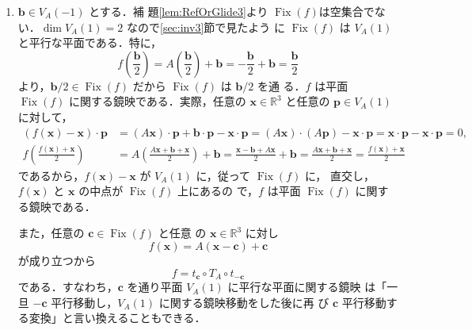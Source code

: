 \documentclass[11pt, uplatex, dvipdfmx, titlepage]{jsarticle}
\makeatletter
\DeclareMathOperator{\Fix}{Fix}
\renewenvironment{proof}[1][\proofname]{\par
  \pushQED{\qed}%
  \normalfont \topsep6\p@\@plus6\p@\relax
  \trivlist
  \item[\hskip\labelsep
         \bfseries
    {#1}]\ignorespaces
}{%
  \popQED\endtrivlist\@endpefalse
}
\theoremstyle{definition}
\renewcommand{\proofname}{\textbf{証明}}
\makeatother
\begin{document}
\begin{proof}[定理\ref{thm:RefOrGlide3}の証明]
  
  \begin{enumerate}[(1)]
  \item $\bm{b} \in V_A(-1)$ とする．補
    題\ref{lem:RefOrGlide3}より $\Fix(f)$は空集合でない．$\dim
    V_A(1)=2$ なので\ref{sec:inv3}節で見たよう
    に $\Fix(f)$ は $V_A(1)$ と平行な平面である．特に，
    \[
      f\left(\frac{\bm{b}}{2}\right) = A\left(\frac{\bm{b}}{2}\right)
      + \bm{b} = -\frac{\bm{b}}{2} + \bm{b} = \frac{\bm{b}}{2}
    \]
    より，$\bm{b}/2 \in \Fix(f)$ だから $\Fix(f)$ は $\bm{b}/2$ を通
    る．$f$ は平面 $\Fix(f)$ に関する鏡映である．実際，任意の $\bm{x}
    \in \mathbb{R}^3$ と任意の $\bm{p} \in V_A(1)$ に対して，
    \begin{align*}
      \left(f(\bm{x})-\bm{x}\right)\cdot  \bm{p} &= (A\bm{x})\cdot  \bm{p} + \bm{b}\cdot \bm{p}
                                                   - \bm{x}\cdot \bm{p}
      =(A\bm{x})\cdot ( A\bm{p}) - \bm{x}\cdot \bm{p} = \bm{x}\cdot \bm{p} - \bm{x}\cdot \bm{p} =0,\\
      f\left(\frac{f(\bm{x})+\bm{x}}{2}\right) &= A\left( \frac{A\bm{x}+\bm{b}+\bm{x}}{2}\right)+\bm{b}
      = \frac{\bm{x}-\bm{b}+A\bm{x}}{2} + \bm{b} 
      = \frac{A\bm{x}+\bm{b}+\bm{x}}{2} = \frac{f(\bm{x})+\bm{x}}{2}
    \end{align*}
    であるから，$f(\bm{x})-\bm{x}$ が $V_A(1)$ に，従って $\Fix(f)$ に，
    直交し，$f(\bm{x})$ と $\bm{x}$ の中点が $\Fix(f)$ 上にあるの
    で，$f$ は平面 $\Fix(f)$ に関する鏡映である．



    また，任意の $\bm{c} \in \Fix(f)$ と任意
    の $\bm{x} \in \mathbb{R}^3$ に対し
    \[
      f(\bm{x}) = A(\bm{x}-\bm{c}) + \bm{c}
    \]
    が成り立つから
    \[
      f=t_{\bm{c}} \circ T_A \circ t_{-\bm{c}}
    \]
    である．すなわち，$\bm{c}$ を通り平面 $V_A(1)$ に平行な平面に関する鏡映
    は「一旦 $-\bm{c}$ 平行移動し，$V_A(1)$ に関する鏡映移動をした後に再
    び $\bm{c}$ 平行移動する変換」と言い換えることもできる．


\end{enumerate}
\end{proof}
\end{document}
